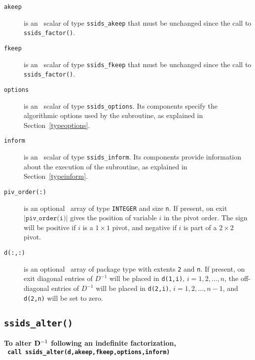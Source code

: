\documentclass{spral}
\begin{document}
\begin{description}

\item[\texttt{akeep}]  is an \intentin\ scalar of type {\tt ssids\_akeep} that
must be unchanged since the call to {\tt ssids\_factor()}.

\item[\texttt{fkeep}]  is an \intentin\ scalar of type {\tt ssids\_fkeep} that
must be unchanged since the call to {\tt ssids\_factor()}.

\item[\texttt{options}] is an \intentin\ scalar of type {\tt ssids\_options}.
Its components specify the algorithmic options used by the subroutine, as
explained in Section~\ref{typeoptions}.

\item[\texttt{inform}] is an \intentout\ scalar of type
{\tt ssids\_inform}. Its components provide information about the execution
of the subroutine, as explained in Section~\ref{typeinform}.

\item[\texttt{piv\_order(:)}] is an optional \intentout\ array of type
{\tt INTEGER} and size {\tt n}. If present, on exit
$|\texttt{piv\_order(i)}|$ gives the position of variable $i$ in the pivot
order. The sign will be positive if $i$ is a $1\times1$ pivot, and negative
if $i$ is part of a $2 \times 2$ pivot.

\item[\texttt{d(:,:)}] is an optional \intentout\ array of package type with
extents {\tt 2} and {\tt n}.
If present, on exit diagonal entries of ${D}^{-1}$ will be placed
in {\tt d(1,i)}, $i = 1,2,\ldots,n$,
the off-diagonal entries  of ${D}^{-1}$ will be placed in
{\tt d(2,i)}, $i = 1,2,\ldots,n-1$, and
{\tt d(2,n)} will be set to zero.

\end{description}



\subsection{\texttt{ssids\_alter()}}
\textbf{To alter ${\bf D}^{-1}$ following an indefinite factorization,
   \vspace*{0.1cm} \\
   \texttt{ \hspace*{0.2cm}
      call ssids\_alter(d,akeep,fkeep,options,inform)
   }
}
\end{document}
